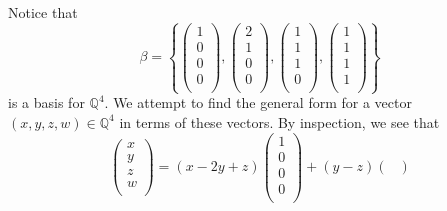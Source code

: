 \documentclass{eh-homework}
\begin{document}
\begin{question}{3}
        Notice that
        \[
            \beta = \left\{ \begin{pmatrix}
                 1 \\
                 0 \\
                 0 \\
                 0 \\
            \end{pmatrix},
            \begin{pmatrix}
                2 \\
                1 \\
                0 \\
                0 \\
            \end{pmatrix},
            \begin{pmatrix}
            1 \\
            1 \\
            1 \\
            0 \\
            \end{pmatrix},
            \begin{pmatrix}
                1 \\
                1 \\
                1 \\
                1 \\
            \end{pmatrix}
             \right\}
        \]
        is a basis for \(\mathbb{Q}^4\). We attempt to find the general form for a vector \((x,y,z,w) \in \mathbb{Q}^4\) in terms of these vectors. By inspection, we see that
        \[
            \begin{pmatrix}
                 x \\
                 y \\
                 z \\
                 w \\
            \end{pmatrix}
            =
            (x - 2y + z)
            \begin{pmatrix}
                1 \\
                0 \\
                0 \\
                0 \\
           \end{pmatrix}
            +(y - z)
            \begin{pmatrix}

\end{pmatrix}\]
\end{question}
\end{document}
